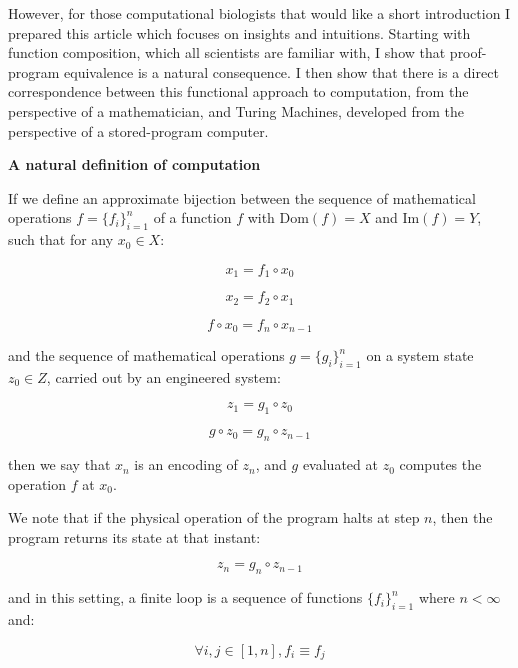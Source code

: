 \documentclass{article}
\begin{document}
However, for those computational biologists that would like a short introduction I prepared this article which focuses
on insights and intuitions. Starting with function composition, which all scientists are familiar with, I show that
proof-program equivalence is a natural consequence. I then show that there is a direct correspondence between this functional
approach to computation, from the perspective of a mathematician, and Turing Machines, developed from the perspective of a
stored-program computer.

\textbf{A natural definition of computation}

If we define an approximate bijection between the sequence of mathematical operations $f = \{f_i\}_{i=1}^n$ of a function $f$ with $\text{Dom}(f) = X$ and $\text{Im}(f)=Y$, such that for any $x_0 \in X$:

\begin{equation}
x_1 = f_1 \circ x_0
\end{equation}

\begin{equation}
x_2 = f_2 \circ x_1
\end{equation}

\begin{equation}
f \circ x_0 = f_n \circ x_{n-1}
\end{equation}

and the sequence of mathematical operations $g = \{g_i\}_{i=1}^n$ on a system state $z_0 \in Z$, carried out by an
engineered system:

\begin{equation}
z_1 = g_1 \circ z_0
\end{equation}

\begin{equation}
g \circ z_0 = g_n \circ z_{n-1}
\end{equation}

then we say that $x_n$ is an encoding of $z_n$, and $g$ evaluated at $z_0$ computes the operation $f$ at $x_0$.

We note that if the physical operation of the program halts at step $n$, then the program returns its state at that instant:

\begin{equation}
z_n = g_n \circ z_{n-1}
\end{equation}

and in this setting, a finite loop is a sequence of functions $\{f_i\}_{i=1}^n$ where $n < \infty$ and:

\begin{equation}
\forall i,j \in [1,n], f_i \equiv f_j
\end{equation}
\end{document}
